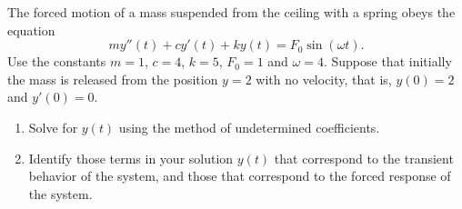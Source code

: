 \documentclass[12pt,letterpaper]{hmcpset}
\begin{document}

\begin{problem}[1]
    The forced motion of a mass suspended from the ceiling with a
    spring obeys the equation
    $$m y''(t)+ c y'(t)+k y(t) = F_0 \sin(\omega t).$$
    Use the constants $m=1$, $c=4$, $k=5$, $F_0=1$ and
    $\omega=4$. Suppose that initially the mass is released from the
    position $y=2$ with no velocity, that is, $y(0)=2$ and $y'(0)=0$.
    \begin{enumerate}
        \item Solve for $y(t)$ using the method of undetermined coefficients.
        \item Identify those terms in your solution $y(t)$ that correspond to
            the transient behavior of the system, and those that correspond to
            the forced response of the system.
    \end{enumerate}
\end{problem}

\begin{solution}
    \vfill
\end{solution}
\newpage
\end{document}
